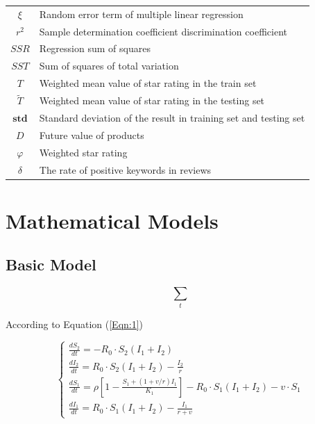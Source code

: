 \documentclass[12pt,a4paper]{article}
\begin{document}
\begin{spacing}{1.2}
\begin{table}[h]
\begin{center}
{\begin{tabular}{c l}
$\xi$ & {Random error term of multiple linear regression} \\
$r^2$ & {Sample determination coefficient discrimination coefficient} \\
$SSR$ & {Regression sum of squares} \\
$SST$ & {Sum of squares of total variation} \\
$T$   & {Weighted mean value of star rating in the train set}\\
$\widetilde{T}$  & {Weighted mean value of star rating in the testing set}\\
$\textbf{std}$  &  {Standard deviation of the result in training set and testing set}\\
$D$ & {Future value of products} \\
$\varphi$ & {Weighted star rating} \\
$\delta$ & {The rate of positive keywords in reviews} \\
\bottomrule
\end{tabular}}
\end{center}
\end{table}



\section{Mathematical Models}
\label{MathModels}


\subsection{Basic Model}

\begin{equation}
\sum\limits_t
\label{Eqn:1}
\end{equation}

According to Equation (\ref{Eqn:1})

\begin{equation}
\left\{ {\begin{array}{*{20}{l}}
{\frac{{d{S_2}}}{{dt}} =  - {R_0} \cdot {S_2}({I_1} + {I_2})}\\
{\frac{{d{I_2}}}{{dt}} = {R_0} \cdot {S_2}({I_1} + {I_2}) - \frac{{{I_2}}}{r}}\\
{\frac{{d{S_1}}}{{dt}} = \rho \left[ {1 - \frac{{{S_1} + (1 + v/r){I_1}}}{{{K_1}}}} \right] - {R_0} \cdot {S_1}({I_1} + {I_2}) - v \cdot {S_1}}\\
{\frac{{d{I_1}}}{{dt}} = {R_0} \cdot {S_1}({I_1} + {I_2}) - \frac{{{I_1}}}{{r + v}}}
\end{array}} \right.
\end{equation}


\end{spacing}
\end{document}
